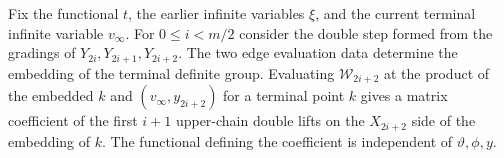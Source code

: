 \begin{lemma}
\label{lem:a-seesaw-double-coefficient}
\emitthmsource
Fix the functional $t$, the earlier infinite variables $\xi$, and the current terminal infinite variable $v_\infty$. For $0\le i<m/2$ consider the double step formed from the gradings of $Y_{2i},Y_{2i+1},Y_{2i+2}$. The two edge evaluation data determine the embedding of the terminal definite group. Evaluating $\mathcal W_{2i+2}$ at the product of the embedded $k$ and $(v_\infty,y_{2i+2})$ for a terminal point $k$ gives a matrix coefficient of the first $i+1$ upper-chain double lifts on the $X_{2i+2}$ side of the embedding of $k$. The functional defining the coefficient is independent of $\vartheta,\phi,y$.
\end{lemma}
